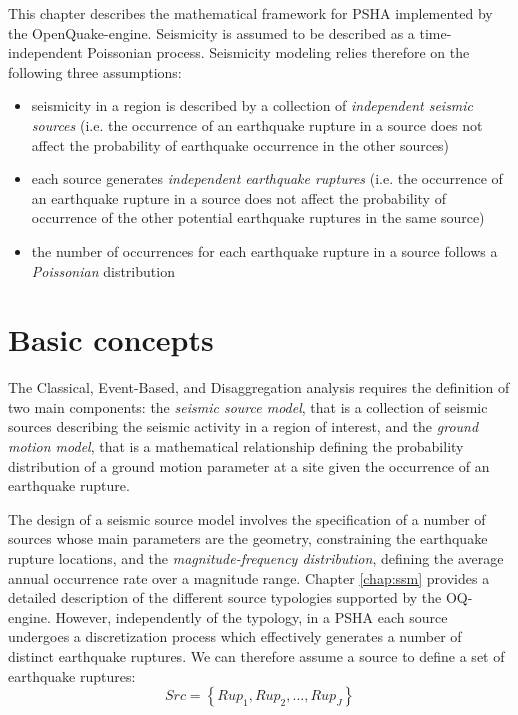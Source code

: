 This chapter describes the mathematical framework for PSHA implemented by the OpenQuake-engine.
Seismicity is assumed to be described as a time-independent Poissonian process. Seismicity modeling
relies therefore on the following three assumptions:
\begin{itemize}
	\item seismicity in a region is described by a collection of \textit{independent seismic sources}
	(i.e. the occurrence of an earthquake rupture in a source does not affect the probability of
	earthquake occurrence in the other sources)
	\item each source generates \textit{independent earthquake ruptures} (i.e. the occurrence of an
	earthquake rupture in a source does not affect the probability of occurrence of the other
	potential earthquake ruptures in the same source)
	\item the number of occurrences for each earthquake rupture in a source follows a \textit{Poissonian}
	distribution
\end{itemize}

\section{Basic concepts}
The Classical, Event-Based, and Disaggregation analysis requires the definition of two main components:
the \textit{seismic source model}, that is a collection of seismic sources describing the seismic activity in a
region of interest, and the \textit{ground motion model}, that is a mathematical relationship defining the
probability distribution of a ground motion parameter at a site given the occurrence of an earthquake
rupture.

The design of a seismic source model involves the specification of a number of sources whose main parameters
are the geometry, constraining the earthquake rupture locations, and the \textit{magnitude-frequency
distribution}, defining the average annual occurrence rate over a magnitude range. Chapter \ref{chap:ssm} provides
a detailed description of the different source typologies supported by the OQ-engine. However, independently
of the typology, in a PSHA each source undergoes a discretization process which effectively generates a
number of distinct earthquake ruptures. We can therefore assume a source to define a set of earthquake ruptures:
\begin{equation}
Src = \left\{Rup_{1}, Rup_{2}, ..., Rup_{J}\right\}
\end{equation}

